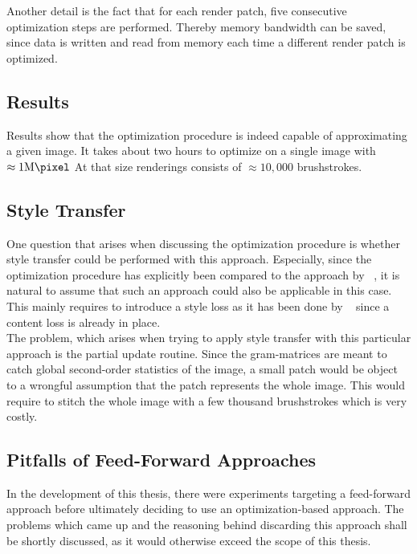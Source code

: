 Another detail is the fact that for each render patch, five consecutive optimization steps are performed.
Thereby memory bandwidth can be saved, since data is written and read from memory each time a different render patch is optimized.

\subsection{Results}
Results show that the optimization procedure is indeed capable of approximating a given image.
It takes about two hours to optimize on a single image with $\approx 1 \si{\mega\pixel}$
At that size renderings consists of $\approx 10,000$ brushstrokes.

\subsection{Style Transfer}

One question that arises when discussing the optimization procedure is whether style transfer could be performed with this approach.
Especially, since the optimization procedure has explicitly been compared to the approach by \citeauthor*{gatys}~\cite{gatys}, it is natural to assume that such an approach could also be applicable in this case.\\
This mainly requires to introduce a style loss as it has been done by \citeauthor*{gatys}~\cite{gatys} since a content loss is already in place.\\
The problem, which arises when trying to apply style transfer with this particular approach is the partial update routine.
Since the gram-matrices are meant to catch global second-order statistics of the image, a small patch would be object to a wrongful assumption that the patch represents the whole image.
This would require to stitch the whole image with a few thousand brushstrokes which is very costly.

\subsection{Pitfalls of Feed-Forward Approaches}
In the development of this thesis, there were experiments targeting a feed-forward approach before ultimately deciding to use an optimization-based approach.
The problems which came up and the reasoning behind discarding this approach shall be shortly discussed, as it would otherwise exceed the scope of this thesis.

